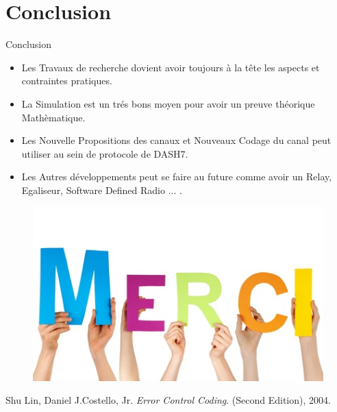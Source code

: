 \documentclass[8pt]{beamer}
\newcommand{\1}{\mathbbm 1}
\begin{document}
%
%
%
  
  




\section{Conclusion}

\begin{frame}{Conclusion}
\begin{itemize}
 
\item Les Travaux de recherche dovient avoir toujours à la tête les aspects et contraintes pratiques.  
\item La Simulation est un trés bons moyen pour avoir un preuve théorique Mathèmatique.
\item Les Nouvelle Propositions des canaux et Nouveaux Codage du canal peut utiliser au sein de protocole de DASH7.
\item Les Autres développements peut se faire au future comme avoir un Relay, Egaliseur, Software Defined Radio ... .
\end{itemize}

\end{frame}


\begin{frame}



\begin{figure}[h!]
  \centering
    \includegraphics[scale=0.5]{figures/merci.jpg}
\end{figure}



\end{frame}




\begin{thebibliography}{9}

Shu Lin, Daniel J.Costello, Jr. 
\textit{Error Control Coding}. (Second Edition), 2004.

\end{thebibliography}
\end{document}

